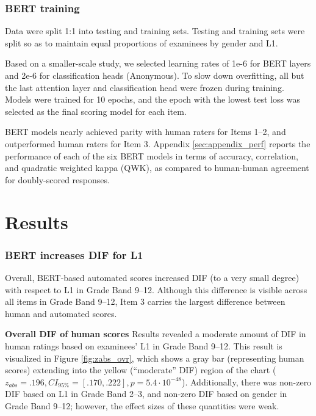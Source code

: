 \documentclass [PhD] {uclathes}
\begin{document}
\subsection{BERT training}

Data were split 1:1 into testing and training sets. Testing and training sets were split so as to maintain equal proportions of examinees by gender and L1.

Based on a smaller-scale study, we selected learning rates of 1e-6 for BERT layers and 2e-6 for classification heads (Anonymous). To slow down overfitting, all but the last attention layer and classification head were frozen during training. Models were trained for 10 epochs, and the epoch with the lowest test loss was selected as the final scoring model for each item. 

BERT models nearly achieved parity with human raters for Items 1–2, and outperformed human raters for Item 3. Appendix \ref{sec:appendix_perf} reports the performance of each of the six BERT models in terms of accuracy, correlation, and quadratic weighted kappa (QWK), as compared to human-human agreement for doubly-scored responses. 

\chapter{Results}

\subsection{BERT increases DIF for L1}
\label{res_rq1}

Overall, BERT-based automated scores increased DIF (to a very small degree) with respect to L1 in Grade Band 9–12. Although this difference is visible across all items in Grade Band 9–12, Item 3 carries the largest difference between human and automated scores. 

\noindent \textbf{Overall DIF of human scores} \;
Results revealed a moderate amount of DIF in human ratings based on examinees’ L1 in Grade Band 9–12. This result is visualized in Figure \ref{fig:zabs_ovr}, which shows a gray bar (representing human scores) extending into the yellow (“moderate” DIF) region of the chart ($z_{abs} = .196, CI_{95\%} = [.170, .222], p = 5.4 \cdot 10^{-48}$). Additionally, there was non-zero DIF based on L1 in Grade Band 2–3, and non-zero DIF based on gender in Grade Band 9–12; however, the effect sizes of these quantities were weak.
\end{document}
